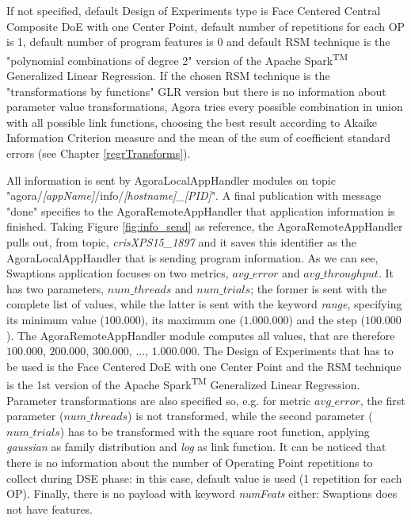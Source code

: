 If not specified, default Design of Experiments type is Face Centered Central Composite DoE with one Center Point, default number of repetitions for each OP is 1, default number of program features is 0 and default RSM technique is the "polynomial combinations of degree 2" version of the Apache Spark\textsuperscript{TM} Generalized Linear Regression. If the chosen RSM technique is the "transformations by functions" GLR version but there is no information about parameter value transformations, Agora tries every possible combination in union with all possible link functions, choosing the best result according to Akaike Information Criterion measure and the mean of the sum of coefficient standard errors (see Chapter \ref{regrTransforms}).

All information is sent by AgoraLocalAppHandler modules on topic "agora\slash{}\textit{[appName]}\slash{}info\slash{}\textit{[hostname]\_[PID]}". A final publication with message "done" specifies to the AgoraRemoteAppHandler that application information is finished. Taking Figure \ref{fig:info_send} as reference, the AgoraRemoteAppHandler pulls out, from topic, \textit{crisXPS15\_1897} and it saves this identifier as the AgoraLocalAppHandler that is sending program information. As we can see, Swaptions application focuses on two metrics, $avg\_error$ and $avg\_throughput$. It has two parameters, $num\_threads$ and $num\_trials$; the former is sent with the complete list of values, while the latter is sent with the keyword \textit{range}, specifying its minimum value ($100.000$), its maximum one ($1.000.000$) and the step ($100.000$). The Agora\-Remote\-App\-Handler module computes all values, that are therefore $100.000$, $200.000$, $300.000$, ..., $1.000.000$. The Design of Experiments that has to be used is the Face Centered DoE with one Center Point and the RSM technique is the 1st version of the Apache Spark\textsuperscript{TM} Generalized Linear Regression. Parameter transformations are also specified so, e.g. for metric $avg\_error$, the first parameter ($num\_threads$) is not transformed, while the second parameter ($num\_trials$) has to be transformed with the square root function, applying \textit{gaussian} as family distribution and \textit{log} as link function. It can be noticed that there is no information about the number of Operating Point repetitions to collect during DSE phase: in this case, default value is used (1 repetition for each OP). Finally, there is no payload with keyword \textit{numFeats} either: Swaptions does not have features.

